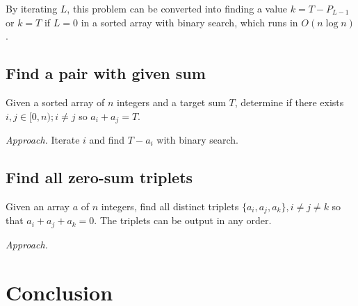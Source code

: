 \documentclass{article}
\begin{document}
    By iterating $L$, this problem can be converted into finding a value $k = T - P_{L-1}$ or $k = T$ if $L = 0$ in a sorted array with binary search, which runs in $O(n \log n)$.


    \subsection{Find a pair with given sum}

    \begin{statement}{}{}
        Given a sorted array of $n$ integers and a target sum $T$, determine if there exists $i, j \in [0, n); i \ne j$ so $a_i + a_j = T$.
    \end{statement}

    \emph{Approach.} Iterate $i$ and find $T - a_i$ with binary search.


    \subsection{Find all zero-sum triplets}

    \begin{statement}{}{}
        Given an array $a$ of $n$ integers, find all distinct triplets $\{a_i, a_j, a_k\}, i \ne j \ne k$ so that $a_i + a_j + a_k = 0$. The triplets can be output in any order.
    \end{statement}

    \emph{Approach.}

   
    \section{Conclusion}

    
    
\end{document}
